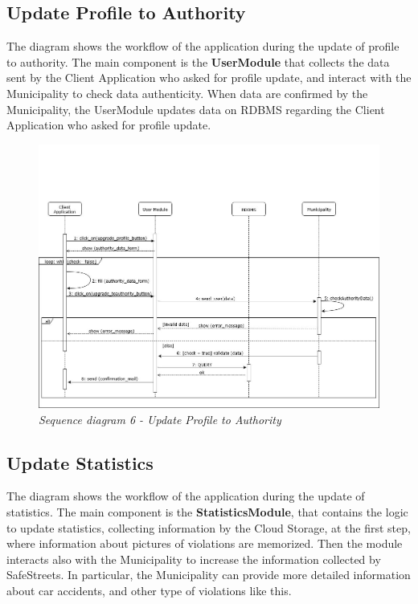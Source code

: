 \subsection{Update Profile to Authority}
The diagram shows the workflow of the application during the update of profile to authority. The main component is the \textbf{UserModule} 
that collects the data sent by the Client Application who asked for profile update, and interact with the Municipality to check data 
authenticity. When data are confirmed by the Municipality, the UserModule updates data on RDBMS regarding the Client Application who asked for 
profile update.

\begin{figure}[H]
  \centering
  \includegraphics[width=\textwidth]{DD_Images/RunTimeView/6.jpg}
  \caption{\textit{Sequence diagram 6 - Update Profile to Authority}}
\end{figure}

\subsection{Update Statistics}
The diagram shows the workflow of the application during the update of statistics. The main component is the \textbf{StatisticsModule}, that
contains the logic to update statistics, collecting information by the Cloud Storage, at the first step, where information about pictures of 
violations are memorized. Then the module interacts also with the Municipality to increase the information collected by SafeStreets. In particular, 
the Municipality can provide more detailed information about car accidents, and other type of violations like this.

